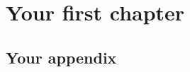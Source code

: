 \documentclass[]{msu-thesis}
\begin{document}

\chapter{Your first chapter}
%
%
%
%
%
\begin{appendix}
\chapter{Your appendix}
\end{appendix}
%
%
%
%
%
\end{document}
